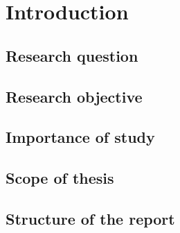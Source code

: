 \chapter{Introduction}
\label{ch:Introduction}


\section{Research question}
\label{sec:ResearchQuestion}

\section{Research objective}
\label{sec:ResearchObjective}

\section{Importance of study}

\section{Scope of thesis}
\label{sec:scope}

\section{Structure of the report}
\label{sec:Structure of the report}


